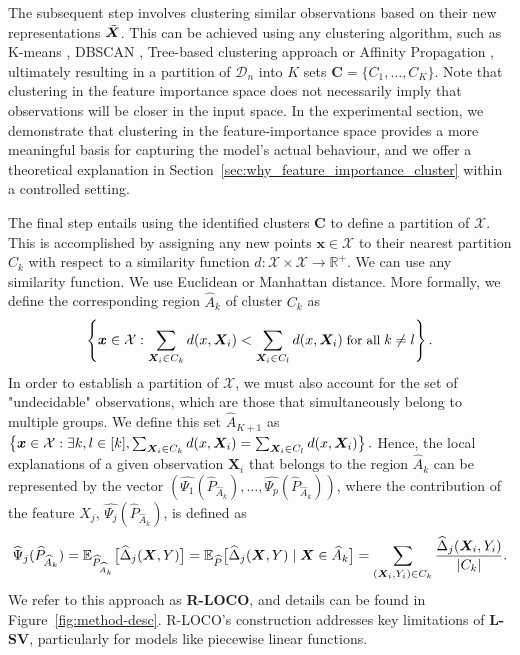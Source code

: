 \documentclass{article}
\newcommand\X{\boldsymbol{X}}
\newcommand\x{\boldsymbol{x}}
\theoremstyle{plain}
\theoremstyle{definition}
\theoremstyle{remark}
\newcommand{\ours}{\textcolor{ours}{\textbf{R-LOCO}}}
\newcommand{\lsv}{\textcolor{lsv}{\textbf{L-SV}}}
\begin{document}
The subsequent step involves clustering similar observations based on their new representations $\Tilde{\X}$. This can be achieved using any clustering algorithm, such as K-means \citep{kmeansmacqueen1967some}, DBSCAN \citep{dbscanester1996density}, Tree-based clustering approach \citep{maimon2014data} or Affinity Propagation \citep{affinitypropfrey2007clustering}, ultimately resulting in a partition of $\mathcal{D}_n$ into $K$ sets $\textbf{C} = \{C_1, \dots, C_K\}$. Note that clustering in the feature importance space does not necessarily imply that observations will be closer in the input space. In the experimental section, we demonstrate that clustering in the feature-importance space provides a more meaningful basis for capturing the model’s actual behaviour, and we offer a theoretical explanation in Section~\ref{sec:why_feature_importance_cluster} within a controlled setting.


The final step entails using the identified clusters $\textbf{C}$ to define a partition of $\mathcal{X}$. This is accomplished by assigning any new points $\x \in \mathcal{X}$ to their nearest partition $C_k$ with respect to a similarity function $d: \mathcal{X} \times \mathcal{X} \rightarrow \mathbb{R}^+$. We can use any similarity function. We use Euclidean or Manhattan distance. More formally, we define the corresponding region $\widehat{A}_k$ of cluster $C_k$ as
\begin{equation*} \small \left\{ \x \in \mathcal{X} : \sum_{\X_i \in C_k} d(x, \X_i) < \sum_{\X_i \in C_l} d(x, \X_i) \; \text{for all} \;  k \neq l \right\}.
\end{equation*} In order to establish a partition of $\mathcal{X}$, we must also account for the set of "undecidable" observations, which are those that simultaneously belong to multiple groups. We define this set $\widehat{A}_{K+1}$ as $\small \left\{\x \in \mathcal{X} : \exists k, l \in [k], \sum_{\X_i \in C_k} d(x, \X_i) = \sum_{\X_i \in C_l} d(x, \X_i)\right\}.$
Hence, the local explanations of a given observation $\X_i$ that belongs to the region  $\widehat{A}_k$ can be represented by the vector $\left(\widehat{\Psi_{1}}(\widehat{P}_{\widehat{A}_k}), \dots, \widehat{\Psi_p}(\widehat{P}_{\widehat{A}_k})\right)$, where the contribution of the feature $X_j$, $\widehat{\Psi_{j}}(\widehat{P}_{\widehat{A}_k})$, is defined as
\begin{align*} \label{eq:regional_loco}
   \small  \widehat{\Psi}_{j}(\widehat{P}_{\widehat{A}_k})  = \mathbb{E}_{\widehat{P}_{\widehat{A}_k}}\big[ \widehat{\Delta}_j(\X, Y)\big] 
    = \mathbb{E}_{\widehat{P}}\big[ \widehat{\Delta}_{j}(\X, Y) \; \vert \; \X \in \widehat{A}_k\big]
     = \sum_{(\X_i, Y_i) \in C_k} \frac{\widehat{\Delta}_{j}(\X_i, Y_i)}{|C_k|}.
\end{align*}
We refer to this approach as \ours{}, and details can be found in Figure~\ref{fig:method-desc}. R-LOCO's construction addresses key limitations of \lsv{}, particularly for models like piecewise linear functions.
\end{document}
